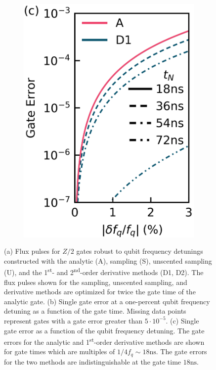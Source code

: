 \begin{figure}[ht]
\begin{subfigure}{.4\textwidth}
    \caption{\label{fig:staticb}}
  \end{subfigure}\hfill
  \begin{subfigure}{.23\textwidth}
    \includegraphics[width=\linewidth]{assets/f2c.png}
    \caption{\label{fig:staticc}}
  \end{subfigure}
  \caption{
    (a) Flux pulses for $Z/2$ gates robust to qubit frequency detunings constructed with the
    analytic (A), sampling (S), unscented sampling (U), and the 1\textsuperscript{st}-
    and 2\textsuperscript{nd}-order derivative methods (D1, D2). The flux pulses shown
    for the sampling, unscented sampling, and derivative methods are optimized
    for twice the gate time of the analytic gate.
    (b) Single gate error at a one-percent qubit frequency detuning as
    a function of the gate time. Missing
    data points represent gates with a gate error greater than $5 \cdot 10^{-5}$.
    (c) Single gate error as a function of the qubit frequency detuning.
    The gate errors for the analytic and 1\textsuperscript{st}-order derivative
    methods are shown for gate times which are multiples of $1 / 4 f_{q} \sim 18 \textrm{ns}$.
    The gate errors for the two methods are
    indistinguishable at the gate time $18 \textrm{ns}$.
  }
  \label{fig:static}
\end{figure}

